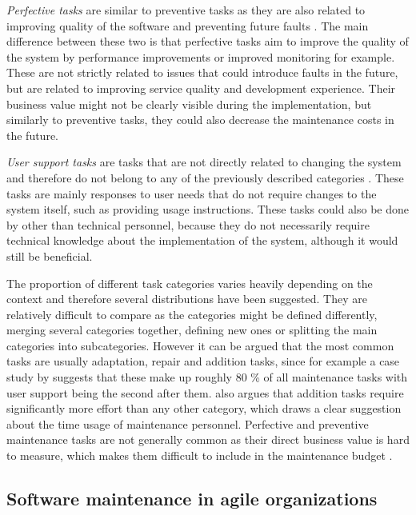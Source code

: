 \emph{Perfective tasks} are similar to preventive tasks as they are also related to improving quality of the software and preventing future faults \citep{Desharnais2010}. The main difference
between these two is that perfective tasks aim to improve the quality of the system by performance improvements or improved monitoring for example. These are not strictly related to issues
that could introduce faults in the future, but are related to improving service quality and development experience. Their business value might not be clearly visible during the implementation,
but similarly to preventive tasks, they could also decrease the maintenance costs in the future.

\emph{User support tasks} are tasks that are not directly related to changing the system and therefore do not belong to any of the previously described categories \citep{Desharnais2010}.
These tasks are mainly responses to user needs that do not require changes to the system itself, such as providing usage instructions. These tasks could also be done by other than technical
personnel, because they do not necessarily require technical knowledge about the implementation of the system, although it would still be beneficial.

The proportion of different task categories varies heavily depending on the context and therefore several distributions have been suggested. They are relatively difficult to compare as the categories
might be defined differently, merging several categories together, defining new ones or splitting the main categories into subcategories. However it can be argued that the most common tasks
are usually adaptation, repair and addition tasks, since for example a case study by \citet{Desharnais2010} suggests that these make up roughly 80 \% of all maintenance tasks with user
support being the second after them. \citet{Sommerville2011} also argues that addition tasks require significantly more effort than any other category, which draws a clear suggestion
about the time usage of maintenance personnel. Perfective and preventive maintenance tasks are not generally common as their direct business value
is hard to measure, which makes them difficult to include in the maintenance budget \citep{Desharnais2010}\citep{Sommerville2011}.

\subsection{Software maintenance in agile organizations}

